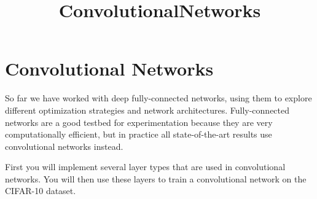 \documentclass[11pt]{article}
\title{ConvolutionalNetworks}
\begin{document}
    
    
    \maketitle
    
    

    
    \hypertarget{convolutional-networks}{%
\section{Convolutional Networks}\label{convolutional-networks}}

So far we have worked with deep fully-connected networks, using them to
explore different optimization strategies and network architectures.
Fully-connected networks are a good testbed for experimentation because
they are very computationally efficient, but in practice all
state-of-the-art results use convolutional networks instead.

First you will implement several layer types that are used in
convolutional networks. You will then use these layers to train a
convolutional network on the CIFAR-10 dataset.
\end{document}
